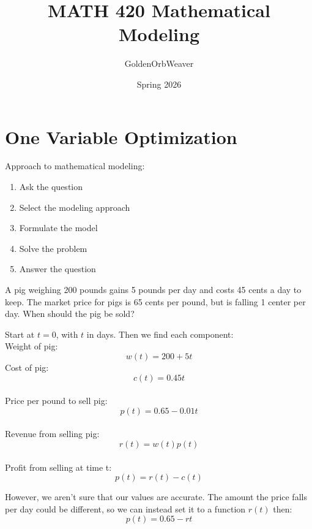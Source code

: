 \documentclass{article}
\title{\textbf{MATH 420 Mathematical Modeling}}
\author{GoldenOrbWeaver}
\date{Spring 2026}
\begin{document}
\maketitle

\tableofcontents{\textbf{}}

\pagebreak

\pagestyle{fancy}
\fancyhead{}
\fancyhead[L]{\thetitle}

\section{One Variable Optimization}
Approach to mathematical modeling:
\begin{enumerate}
    \item Ask the question
    \item Select the modeling approach
    \item Formulate the model
    \item Solve the problem
    \item Answer the question
\end{enumerate}

\begin{eg}
    A pig weighing 200 pounds gains 5 pounds per day and costs 45 cents a day 
    to keep. The market price for pigs is 65 cents per pound, but is falling
     1 center per day. When should the pig be sold?
\end{eg}

\begin{answer}
    Start at \(t=0\), with \(t\)  in days. Then we find each component:\\
    Weight of pig:   \\
    \[
        w(t)=200+5t
    \]
    Cost of pig: \[c(t)=0.45t\] \\
    Price per pound to sell pig: \[p(t)=0.65-0.01t\] \\
    Revenue from selling pig: \[r(t)=w(t)p(t)\]\\
    Profit from selling at time t: \[p(t)=r(t)-c(t)\]
\end{answer}

However, we aren't sure that our values are accurate. The amount the price
falls per day could be different, so we can instead set it to a function \(r(t)\)
then:
\[
    p(t)=0.65-rt
\]
\end{document}
